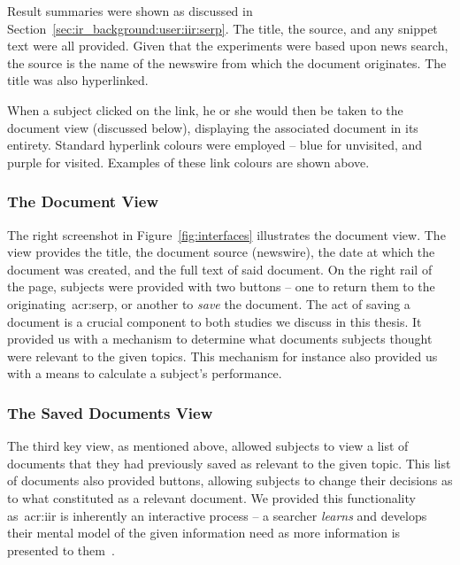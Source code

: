 Result summaries were shown as discussed in Section~\ref{sec:ir_background:user:iir:serp}. The title, the source, and any snippet text were all provided. Given that the experiments were based upon news search, the source is the name of the newswire from which the document originates. The title was also hyperlinked.

\begin{figure}[h]
    \centering
    \vspace{0mm}
    \label{fig:serp_links}
    \vspace{-13mm}
\end{figure}

When a subject clicked on the link, he or she would then be taken to the document view (discussed below), displaying the associated document in its entirety. Standard hyperlink colours were employed -- blue for unvisited, and purple for visited. Examples of these link colours are shown above.

\subsubsection{The Document View}\label{sec:methodology:user:interface:document}
The right screenshot in Figure~\ref{fig:interfaces} illustrates the document view. The view provides the title, the document source (newswire), the date at which the document was created, and the full text of said document. On the right rail of the page, subjects were provided with two buttons -- one to return them to the originating~\gls{acr:serp}, or another to \emph{save} the document. The act of saving a document is a crucial component to both studies we discuss in this thesis. It provided us with a mechanism to determine what documents subjects thought were relevant to the given topics. This mechanism for instance also provided us with a means to calculate a subject's performance.

\subsubsection{The Saved Documents View}\label{sec:methodology:user:interface:saved}
The third key view, as mentioned above, allowed subjects to view a list of documents that they had previously saved as relevant to the given topic. This list of documents also provided buttons, allowing subjects to change their decisions as to what constituted as a relevant document. We provided this functionality as~\gls{acr:iir} is inherently an interactive process -- a searcher \emph{learns} and develops their mental model of the given information need as more information is presented to them~\citep{ingwersen2005theturn}.

